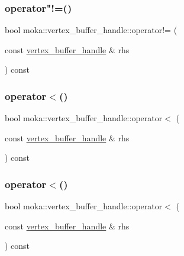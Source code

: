 \mbox{\label{structmoka_1_1vertex__buffer__handle_a864be1ddc3374ffcaccc9712b04829d7}} 
\subsubsection{\texorpdfstring{operator"!=()}{operator!=()}}
{\footnotesize\ttfamily bool moka\+::vertex\+\_\+buffer\+\_\+handle\+::operator!= (\begin{DoxyParamCaption}\item[{const \mbox{\hyperlink{structmoka_1_1vertex__buffer__handle}{vertex\+\_\+buffer\+\_\+handle}} \&}]{rhs }\end{DoxyParamCaption}) const}

\mbox{\label{structmoka_1_1vertex__buffer__handle_ae68b95f114abecd5e9c15fd334fa8fe1}} 
\subsubsection{\texorpdfstring{operator$<$()}{operator<()}\hspace{0.1cm}{\footnotesize\ttfamily [1/2]}}
{\footnotesize\ttfamily bool moka\+::vertex\+\_\+buffer\+\_\+handle\+::operator$<$ (\begin{DoxyParamCaption}\item[{const \mbox{\hyperlink{structmoka_1_1vertex__buffer__handle}{vertex\+\_\+buffer\+\_\+handle}} \&}]{rhs }\end{DoxyParamCaption}) const}

\mbox{\label{structmoka_1_1vertex__buffer__handle_ae68b95f114abecd5e9c15fd334fa8fe1}} 
\subsubsection{\texorpdfstring{operator$<$()}{operator<()}\hspace{0.1cm}{\footnotesize\ttfamily [2/2]}}
{\footnotesize\ttfamily bool moka\+::vertex\+\_\+buffer\+\_\+handle\+::operator$<$ (\begin{DoxyParamCaption}\item[{const \mbox{\hyperlink{structmoka_1_1vertex__buffer__handle}{vertex\+\_\+buffer\+\_\+handle}} \&}]{rhs }\end{DoxyParamCaption}) const}

